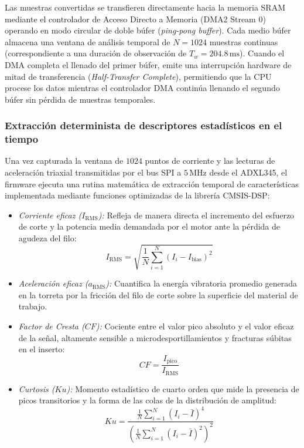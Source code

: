 Las muestras convertidas se transfieren directamente hacia la memoria SRAM mediante el controlador de Acceso Directo a Memoria (DMA2 Stream 0) operando en modo circular de doble búfer (\textit{ping-pong buffer}). Cada medio búfer almacena una ventana de análisis temporal de $N = 1024$ muestras continuas (correspondiente a una duración de observación de $T_w = 204.8\,\text{ms}$). Cuando el DMA completa el llenado del primer búfer, emite una interrupción hardware de mitad de transferencia (\textit{Half-Transfer Complete}), permitiendo que la CPU procese los datos mientras el controlador DMA continúa llenando el segundo búfer sin pérdida de muestras temporales.

\subsubsection{Extracción determinista de descriptores estadísticos en el tiempo}
Una vez capturada la ventana de $1024$ puntos de corriente y las lecturas de aceleración triaxial transmitidas por el bus SPI a $5\,\text{MHz}$ desde el ADXL345, el firmware ejecuta una rutina matemática de extracción temporal de características implementada mediante funciones optimizadas de la librería CMSIS-DSP:

\begin{itemize}
    \item \textit{Corriente eficaz ($I_{\text{RMS}}$):} Refleja de manera directa el incremento del esfuerzo de corte y la potencia media demandada por el motor ante la pérdida de agudeza del filo:
    \begin{equation}
    I_{\text{RMS}} = \sqrt{\frac{1}{N} \sum_{i=1}^{N} (I_i - I_{\text{bias}})^2}
    \end{equation}
    \item \textit{Aceleración eficaz ($a_{\text{RMS}}$):} Cuantifica la energía vibratoria promedio generada en la torreta por la fricción del filo de corte sobre la superficie del material de trabajo.
    \item \textit{Factor de Cresta ($CF$):} Cociente entre el valor pico absoluto y el valor eficaz de la señal, altamente sensible a microdesportillamientos y fracturas súbitas en el inserto:
    \begin{equation}
    CF = \frac{I_{\text{pico}}}{I_{\text{RMS}}}
    \end{equation}
    \item \textit{Curtosis ($Ku$):} Momento estadístico de cuarto orden que mide la presencia de picos transitorios y la forma de las colas de la distribución de amplitud:
    \begin{equation}
    Ku = \frac{\frac{1}{N} \sum_{i=1}^{N} (I_i - \bar{I})^4}{\left(\frac{1}{N} \sum_{i=1}^{N} (I_i - \bar{I})^2\right)^2}
    \end{equation}
\end{itemize}

